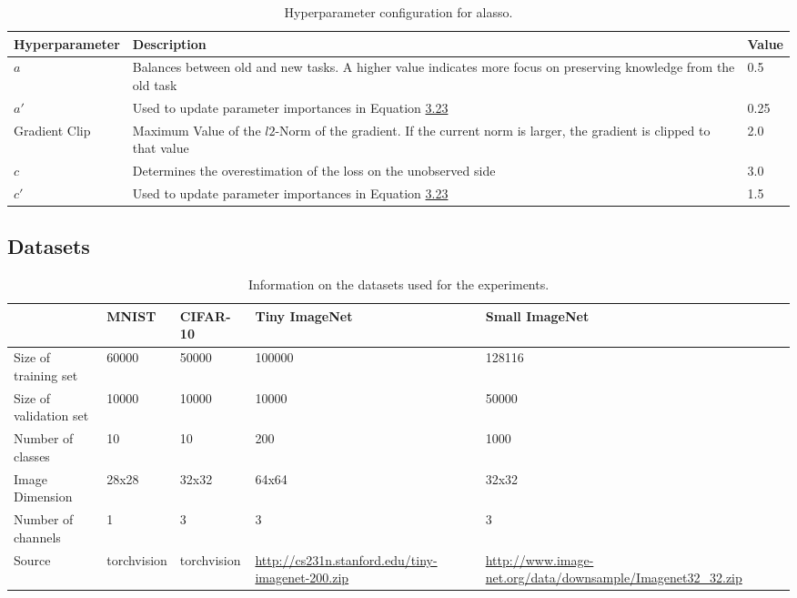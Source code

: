 \begin{table}[!htb]
    \centering
    \begin{tabularx}{\textwidth}{| l | X | l |} 
        \hline
        Hyperparameter & Description & Value \\ 
        \hline 
        \hline
        $a$ & Balances between old and new tasks. A higher value indicates more focus
        on preserving knowledge from the old task & 0.5  \\ 
        \hline
        $a'$ & Used to update parameter importances in Equation \hyperref[eq:ALASSO_Small_Omega]{3.23} & 0.25  \\
        \hline
        Gradient Clip & Maximum Value of the $l2$-Norm of the gradient. If the current norm is larger, the
        gradient is clipped to that value & 2.0 \\ 
        \hline
        $c$ & Determines the overestimation of the loss on the unobserved side & 3.0 \\
        \hline
        $c'$ & Used to update parameter importances in Equation \hyperref[eq:ALASSO_Small_Omega]{3.23} & 1.5 \\
        \hline
    \end{tabularx}
    \caption{Hyperparameter configuration for \gls{alasso}.}
    \label{fig:AlassoParams}
\end{table}

\subsection{Datasets}
\label{sec:Appendix:Datasets}

\begin{table}[!htb]
    \centering
    \begin{tabularx}{\textwidth}{|X || X | X | X | X|} 
        \hline
         & MNIST & CIFAR-10 & Tiny \newline ImageNet & Small \newline ImageNet \\ 
        \hline 
        \hline
        Size of training set & 60000 & 50000 & 100000 & 128116 \\ 
        \hline
        Size of validation set & 10000 & 10000 & 10000 & 50000\\
        \hline
        Number of classes & 10 & 10 & 200 & 1000 \\
        \hline
        Image Dimension & 28x28 & 32x32 & 64x64& 32x32\\
        \hline
        Number of channels & 1 & 3 & 3 & 3 \\
        \hline
        Source & torchvision & torchvision & {\small \url{http://cs231n.stanford.edu/tiny-imagenet-200.zip}} & {\small \url{http://www.image-net.org/data/downsample/Imagenet32_32.zip}} \\
        \hline
    \end{tabularx}
    \caption{Information on the datasets used for the experiments.}
    \label{fig:DatasetInformtion}
\end{table}

